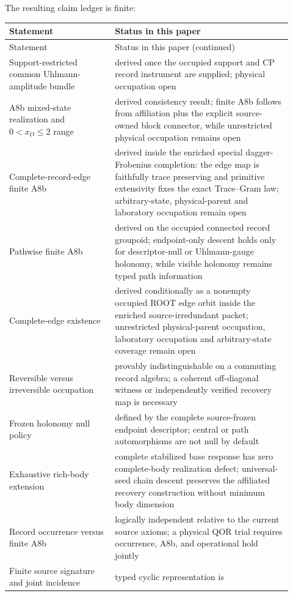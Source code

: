 \documentclass[11pt]{article}
\begin{document}
The resulting claim ledger is finite:
\small
\begin{longtable}{L{0.34\linewidth}L{0.58\linewidth}}
\toprule
Statement & Status in this paper\\
\midrule
\endfirsthead
\toprule
Statement & Status in this paper (continued)\\
\midrule
\endhead
Support-restricted common Uhlmann-amplitude bundle & derived once the occupied
support and CP record instrument are supplied; physical occupation open\\
A8b mixed-state realization and \(0<x_O\leq2\) range & derived consistency
result; finite A8b follows from affiliation plus the explicit source-owned
block connector, while unrestricted physical occupation remains open\\
Complete-record-edge finite A8b & derived inside the enriched special
dagger-Frobenius completion: the edge map is faithfully trace preserving and
primitive extensivity fixes the exact Trace--Gram law; arbitrary-state,
physical-parent and laboratory occupation remain open\\
Pathwise finite A8b & derived on the occupied connected record groupoid;
endpoint-only descent holds only for descriptor-null or Uhlmann-gauge
holonomy, while visible holonomy remains typed path information\\
Complete-edge existence & derived conditionally as a nonempty occupied ROOT
edge orbit inside the enriched source-irredundant packet; unrestricted
physical-parent occupation, laboratory occupation and arbitrary-state
coverage remain open\\
Reversible versus irreversible occupation & provably indistinguishable on a
commuting record algebra; a coherent off-diagonal witness or independently
verified recovery map is necessary\\
Frozen holonomy null policy & defined by the complete source-frozen endpoint
descriptor; central or path automorphisms are not null by default\\
Exhaustive rich-body extension & complete stabilized base response has zero
complete-body realization defect; universal-seed chain descent preserves the
affiliated recovery construction without minimum body dimension\\
Record occurrence versus finite A8b & logically independent relative to the
current source axioms; a physical QOR trial requires occurrence, A8b, and
operational hold jointly\\
Finite source signature and joint incidence & typed cyclic representation is

\end{longtable}
\end{document}
